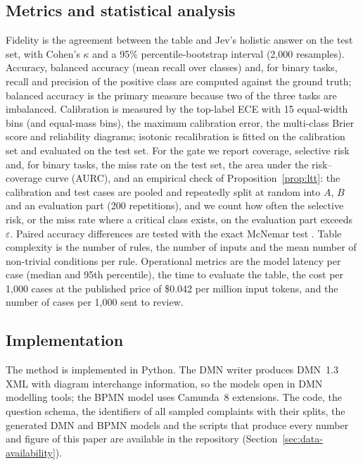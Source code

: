 \documentclass[a4paper,fleqn]{cas-sc}
\theoremstyle{definition}
\newcommand{\jev}{Jev}
\begin{document}
\subsection{Metrics and statistical analysis}
Fidelity is the agreement between the table and \jev{}'s holistic answer on the test set, with Cohen's $\kappa$ \citep{cohen1960} and a 95\% percentile-bootstrap interval (2{,}000 resamples). Accuracy, balanced accuracy (mean recall over classes) and, for binary tasks, recall and precision of the positive class are computed against the ground truth; balanced accuracy is the primary measure because two of the three tasks are imbalanced. Calibration is measured by the top-label ECE with 15 equal-width bins (and equal-mass bins), the maximum calibration error, the multi-class Brier score \citep{brier1950} and reliability diagrams; isotonic recalibration is fitted on the calibration set and evaluated on the test set. For the gate we report coverage, selective risk and, for binary tasks, the miss rate on the test set, the area under the risk--coverage curve (AURC), and an empirical check of Proposition~\ref{prop:ltt}: the calibration and test cases are pooled and repeatedly split at random into $A$, $B$ and an evaluation part (200 repetitions), and we count how often the selective risk, or the miss rate where a critical class exists, on the evaluation part exceeds $\varepsilon$. Paired accuracy differences are tested with the exact McNemar test \citep{mcnemar1947}. Table complexity is the number of rules, the number of inputs and the mean number of non-trivial conditions per rule. Operational metrics are the model latency per case (median and 95th percentile), the time to evaluate the table, the cost per 1{,}000 cases at the published price of \$0.042 per million input tokens, and the number of cases per 1{,}000 sent to review.

\subsection{Implementation}
The method is implemented in Python. The DMN writer produces DMN~1.3 XML with diagram interchange information, so the models open in DMN modelling tools; the BPMN model uses Camunda~8 extensions. The code, the question schema, the identifiers of all sampled complaints with their splits, the generated DMN and BPMN models and the scripts that produce every number and figure of this paper are available in the repository (Section~\ref{sec:data-availability}).

\end{document}
